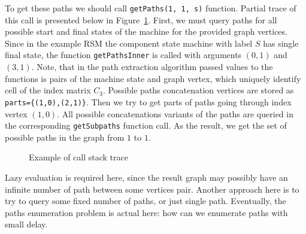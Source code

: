 To get these paths we should call \verb|getPaths(1, 1, s)| function.
Partial trace of this call is presented below in Figure~\ref{trc:example}. 
First, we must query paths for all possible start and final states of the 
machine for the provided graph vertices. Since in the example RSM the component 
state machine with label $S$ has single final state, the function 
\verb|getPathsInner| is called with arguments $(0,1)$ and $(3,1)$.
Note, that in the path extraction algorithm passed values to the functions is 
pairs of the machine state and graph vertex, which uniquely identify cell of 
the index matrix $C_3$. Possible paths concatenation vertices are stored as \verb|parts={(1,0),(2,1)}|. Then we try to get parts of paths going through 
index vertex $(1,0)$. All possible concatenations variants of the paths are 
queried in the corresponding \verb|getSubpaths| function call. As the result,
we get the set of possible paths in the graph from $1$ to $1$.

\begin{figure}
\begin{minipage}[t]{0.48\textwidth}
{
\scriptsize
\setlength{\DTbaselineskip}{8pt}
\DTsetlength{0.2em}{0.5em}{0.2em}{0.4pt}{1.6pt}
}
\caption{Example of call stack trace}
\label{trc:example}
\end{minipage}
\end{figure}

Lazy evaluation is required here, since the result graph may possibly have an 
infinite number of path between some vertices pair. Another approach here is 
to try to query some fixed number of paths, or just single path. Eventually, 
the paths enumeration problem is actual here: how can we enumerate paths with small delay.